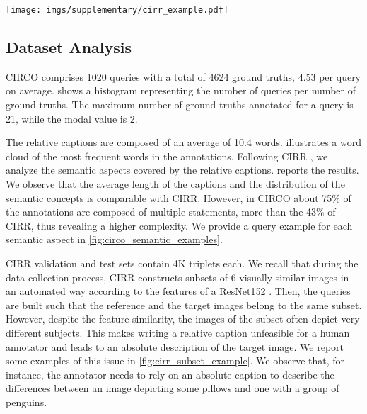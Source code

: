 \documentclass[10pt,twocolumn,letterpaper]{article}
\begin{document}
\begin{figure*}
     \centering
     \texttt{[image: imgs/supplementary/cirr\_example.pdf]}
     \caption{Examples of queries belonging to the CIRR dataset \cite{liu2021image}. The subsets of images depict very different subjects and the relative captions do not consider the reference images. We highlight the target image with a green border.}
     \label{fig:cirr_subset_example}
 \end{figure*}


\subsection{Dataset Analysis} \label{sec:dataset_analysis}
CIRCO comprises 1020 queries with a total of 4624 ground truths, 4.53 per query on average.  shows a histogram representing the number of queries per number of ground truths. The maximum number of ground truths annotated for a query is 21, while the modal value is 2. 

The relative captions are composed of an average of 10.4 words.
 illustrates a word cloud of the most frequent words in the annotations. Following CIRR \cite{liu2021image}, we analyze the semantic aspects covered by the relative captions.  reports the results. We observe that the average length of the captions and the distribution of the semantic concepts is comparable with CIRR. However, in CIRCO about 75\% of the annotations are composed of multiple statements, more than the 43\% of CIRR, thus revealing a higher complexity. We provide a query example for each semantic aspect in \cref{fig:circo_semantic_examples}.

CIRR \cite{liu2021image} validation and test sets contain 4K triplets each. We recall that during the data collection process, CIRR constructs subsets of 6 visually similar images in an automated way according to the features of a ResNet152 \cite{he2016deep}. Then, the queries are built such that the reference and the target images belong to the same subset. However, despite the feature similarity, the images of the subset often depict very different subjects. This makes writing a relative caption unfeasible for a human annotator and leads to an absolute description of the target image. We report some examples of this issue in \cref{fig:cirr_subset_example}. We observe that, for instance, the annotator needs to rely on an absolute caption to describe the differences between an image depicting some pillows and one with a group of penguins.
\end{document}
